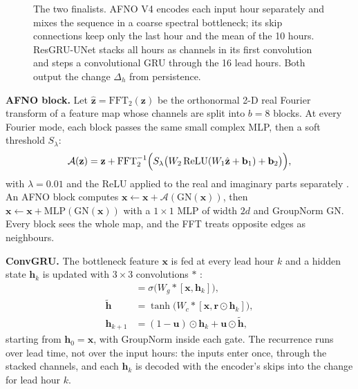 \documentclass[conference]{IEEEtran}
\begin{document}
\begin{figure}[!t]
\caption{The two finalists. AFNO V4 encodes each input hour separately and mixes the sequence in a coarse spectral bottleneck; its skip connections keep only the last hour and the mean of the 10 hours. ResGRU-UNet stacks all hours as channels in its first convolution and steps a convolutional GRU through the 16 lead hours. Both output the change $\Delta_h$ from persistence.}
\label{fig:arch}
\end{figure}

\textbf{AFNO block.} Let $\hat{\mathbf{z}}=\mathrm{FFT}_2(\mathbf{z})$ be the orthonormal 2-D real Fourier transform of a feature map whose channels are split into $b=8$ blocks. At every Fourier mode, each block passes the same small complex MLP, then a soft threshold $S_\lambda$:
\begin{equation}
\mathcal{A}(\mathbf{z}) = \mathbf{z} + \mathrm{FFT}_2^{-1}\Bigl(S_\lambda\bigl(W_2\,\mathrm{ReLU}(W_1\hat{\mathbf{z}}+\mathbf{b}_1)+\mathbf{b}_2\bigr)\Bigr),
\end{equation}
with $\lambda=0.01$ and the ReLU applied to the real and imaginary parts separately \cite{guibas2022afno}. An AFNO block computes $\mathbf{x}\leftarrow\mathbf{x}+\mathcal{A}(\mathrm{GN}(\mathbf{x}))$, then $\mathbf{x}\leftarrow\mathbf{x}+\mathrm{MLP}(\mathrm{GN}(\mathbf{x}))$ with a $1\times1$ MLP of width $2d$ and GroupNorm GN. Every block sees the whole map, and the FFT treats opposite edges as neighbours.

\textbf{ConvGRU.} The bottleneck feature $\mathbf{x}$ is fed at every lead hour $k$ and a hidden state $\mathbf{h}_k$ is updated with $3\times3$ convolutions $*$ \cite{ballas2016convgru}:
\begin{align}
[\mathbf{r},\mathbf{u}] &= \sigma\bigl(W_g * [\mathbf{x},\mathbf{h}_k]\bigr), \\
\tilde{\mathbf{h}} &= \tanh\bigl(W_c * [\mathbf{x},\mathbf{r}\odot\mathbf{h}_k]\bigr), \\
\mathbf{h}_{k+1} &= (1-\mathbf{u})\odot\mathbf{h}_k + \mathbf{u}\odot\tilde{\mathbf{h}},
\end{align}
starting from $\mathbf{h}_0=\mathbf{x}$, with GroupNorm inside each gate. The recurrence runs over lead time, not over the input hours: the inputs enter once, through the stacked channels, and each $\mathbf{h}_{k}$ is decoded with the encoder's skips into the change for lead hour $k$.
\end{document}

